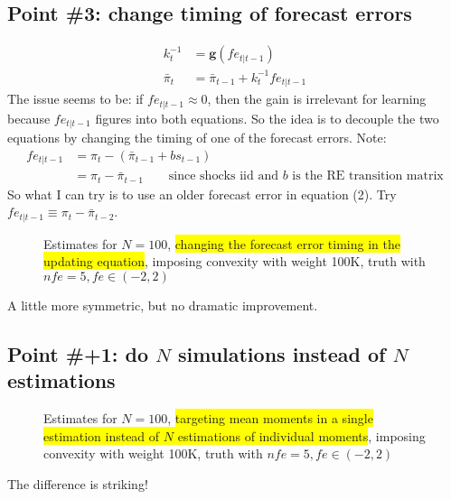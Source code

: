 \documentclass[11pt]{article}
\def \myFigPath {../../figures/}
\renewcommand{\[}{\begin{equation}}
\renewcommand{\]}{\end{equation}}
\def\mySmallerFigScale{0.18}
\def\myTinyFigScale{0.16}
\begin{document}
\newpage 
\subsection*{Point \#3:  change timing of forecast errors}
\begin{align}
k_t^{-1} &= \mathbf{g}(fe_{t|t-1}) \label{gaineq}\\
\bar{\pi}_t &= \bar{\pi}_{t-1} + k_t^{-1}fe_{t|t-1} \label{pibeq}
\end{align}
The issue 	seems to be: if $fe_{t|t-1} \approx 0$, then the gain is irrelevant for learning because $fe_{t|t-1}$ figures into both equations. So the idea is to decouple the two equations by changing the timing of one of the forecast errors. Note:
\begin{align}
fe_{t|t-1} &= \pi_t - (\bar{\pi}_{t-1}+bs_{t-1})\\
&= \pi_t - \bar{\pi}_{t-1} \quad \quad \text{since shocks iid and $b$ is the RE transition matrix}
\end{align}
So what I can try is to use an older forecast error in equation (2). Try $fe_{t|t-1}\equiv \pi_t - \bar{\pi}_{t-2}$.
\begin{figure}[h!]
\hfill
{}
\caption{Estimates for $N=100$, \colorbox{yellow}{changing the forecast error timing in the updating equation}, imposing convexity with weight 100K, truth with $nfe=5, fe \in(-2,2)$}
\end{figure}

A little more symmetric, but no dramatic improvement. 


\newpage
\subsection*{Point \#+1: do $N$ simulations instead of $N$ estimations}
\begin{figure}[h!]
\hfill
{}
\caption{Estimates for $N=100$, \colorbox{yellow}{targeting mean moments in a single estimation instead of $N$ estimations of individual moments}, imposing convexity with weight 100K, truth with $nfe=5, fe \in(-2,2)$}
\end{figure}
The difference is striking!
\end{document}
